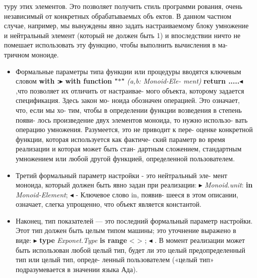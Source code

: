 \newpage
\begin{center}
\parbox{12cm}{
туру этих элементов. Это позволяет получить стиль программи­
рования, очень независимый от конкретных обрабатываемых объ­
ектов. В данном частном случае, например, мы вынуждены явно
задать настраиваемому блоку умножение и нейтральный элемент
(который не должен быть 1) и впоследствии ничто не помешает
использовать эту функцию, чтобы выполнить вычисления в ма­-
тричном моноиде.}
\end{center}
\begin{itemize}
\item Формальные параметры типа функции или процедуры вводятся\linebreak
ключевым словом {\bf with :}$\blacktriangleright$ {\bf with function "$\ast$"}
{\it (a,b: Monoid-Ele-\linebreak 
­ment)} {\bf return .....}$\blacktriangleleft$,что позволяет их отличить от настраивае­-\linebreak
мого объекта, которому задается спецификация. Здесь закон мо­-\linebreak
ноида обозначен операцией. Это означает, что, если мы хо­-\linebreak
тим, чтобы в определении функции возведения в степень появи­-\linebreak
лось произведение двух элементов моноида, то нужно использо­-\linebreak
вать операцию умножения. Разумеется, это не приводит к пере­-\linebreak
оценке конкретной функции, которая используется как фактиче­-\linebreak
ский параметр во время реализации и которая может быть стан­-\linebreak
дартным сложением, стандартным умножением или любой другой\linebreak
функцией, определенной пользователем.
\item Третий формальный параметр настройки - это нейтральный эле­-\linebreak
мент моноида, который должен быть явно задан при реализации:\linebreak
$\blacktriangleright$ {\it Monoid.unit}: {\bf in} {\it Monoid-Element}; $\blacktriangleleft$ - Ключевое слово in, появив­-\linebreak
шееся в этом описании, означает, слегка упрощенно, что объект\linebreak
является константой.
\item Наконец, тип показателей — это последний формальный параметр\linebreak
настройки. Этот тип должен быть целым типом машины; это\linebreak
уточнение выражено в виде: $\blacktriangleright$ {\bf type} {\it Exponet.Type} {\bf is range} < > ; $\blacktriangleleft$ .\linebreak
В момент реализации может быть использован любой целый тип,\linebreak
будет ли это целый предопределенный тип или целый тип, опреде­-\linebreak
ленный пользователем («целый тип» подразумевается в значении\linebreak
языка Ада).
\end{itemize}
